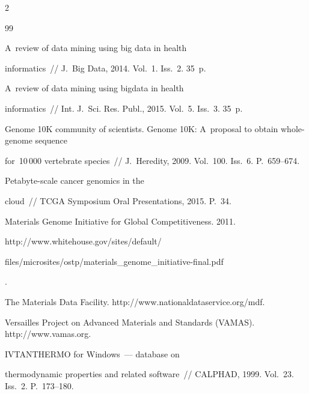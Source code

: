 \begin{multicols}{2}
{{\begin{thebibliography}{99}


 A~review of data mining using big data in health 


informatics~// J.~Big Data, 2014. Vol.~1. Iss.~2. 35~p.







 A~review of data mining using bigdata in health 


informatics~// Int. J.~Sci. Res. Publ., 2015. Vol.~5. Iss.~3. 35~p.







Genome 10K community of scientists. Genome 10K: A~proposal to obtain whole-genome sequence 


for~10\,000 vertebrate species~// J.~Heredity, 2009. Vol.~100. Iss.~6. P.~659--674.




 Petabyte-scale cancer genomics in the 


cloud~// TCGA Symposium  Oral Presentations, 2015. P.~34.




Materials Genome Initiative for Global Competitiveness. 2011. {\sf 


http://www.whitehouse.gov/sites/default/ \linebreak 


files/microsites/ostp/materials\_genome\_initiative-final.pdf}.




The Materials Data Facility. {\sf http://www.\linebreak nationaldataservice.org/mdf}.




Versailles Project on Advanced Materials and Standards (VAMAS). http://www.vamas.org.




 IVTANTHERMO for Windows~--- database on 


thermodynamic properties and related software~// CALPHAD, 1999. Vol.~23. Iss.~2. P.~173--180.





\end{thebibliography}}}
\end{multicols}
